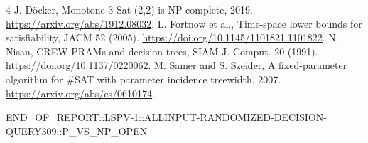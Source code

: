 \documentclass[11pt]{article}
\begin{document}
\begin{thebibliography}{4}
 J. D\"ocker, Monotone 3-Sat-(2,2) is NP-complete, 2019. \url{https://arxiv.org/abs/1912.08032}.
 L. Fortnow et al., Time-space lower bounds for satisfiability, JACM 52 (2005). \url{https://doi.org/10.1145/1101821.1101822}.
 N. Nisan, CREW PRAMs and decision trees, SIAM J. Comput. 20 (1991). \url{https://doi.org/10.1137/0220062}.
 M. Samer and S. Szeider, A fixed-parameter algorithm for \#SAT with parameter incidence treewidth, 2007. \url{https://arxiv.org/abs/cs/0610174}.
\end{thebibliography}
\noindent END\_OF\_REPORT::LSPV-1::ALLINPUT-RANDOMIZED-DECISION-QUERY309::P\_VS\_NP\_OPEN
\end{document}
